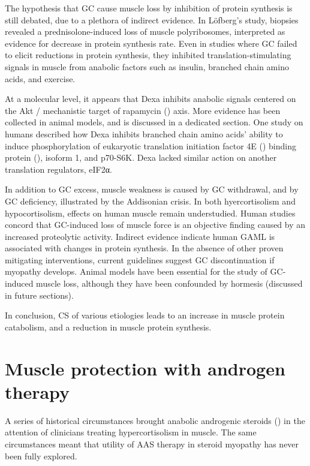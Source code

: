 \documentclass[12pt,english]{report}\usepackage[]{graphicx}\usepackage[]{color}
\begin{document}
The hypothesis that GC cause muscle loss by inhibition of protein
synthesis is still debated, due to a plethora of indirect evidence.
In Löfberg's study, biopsies revealed a prednisolone-induced loss
of muscle polyribosomes, interpreted as evidence for decrease in protein
synthesis rate. Even in studies where GC failed to elicit reductions
in protein synthesis, they inhibited translation-stimulating signals
in muscle from anabolic factors such as insulin\citep{louard1994glucocorticoids},
branched chain amino acids\citep{liu2001branched}, and exercise\citep{garrel1988effects}.

At a molecular level, it appears that Dexa inhibits anabolic signals
centered on the Akt / mechanistic target of rapamycin ()
axis. More evidence has been collected in animal models, and is discussed
in a dedicated section. One study on humans described how Dexa inhibits
branched chain amino acids' ability to induce phosphorylation of eukaryotic
translation initiation factor 4E ()
binding protein (), isoform
1, and p70-S6K\citep{liu2004glucocorticoids}. Dexa lacked similar
action on another translation regulators, eIF2α.

In addition to GC excess, muscle weakness is caused by GC withdrawal\citep{amatruda1960study},
and by GC deficiency, illustrated by the Addisonian crisis\citep{mor1987myopathy}.
In both hyercortisolism and hypocortisolism, effects on human muscle
remain understudied. Human studies concord that GC-induced loss of
muscle force is an objective finding caused by an increased proteolytic
activity. Indirect evidence indicate human GAML is associated with
changes in protein synthesis. In the absence of other proven mitigating
interventions, current guidelines suggest GC discontinuation if myopathy
develops. Animal models have been essential for the study of GC-induced
muscle loss, although they have been confounded by hormesis (discussed
in future sections).

In conclusion, CS of various etiologies leads to an increase in muscle
protein catabolism, and a reduction in muscle protein synthesis.


\section{Muscle protection with androgen therapy}

A series of historical circumstances brought anabolic androgenic steroids
() in the attention
of clinicians treating hypercortisolism in muscle. The same circumstances
meant that utility of AAS therapy in steroid myopathy has never been
fully explored.
\end{document}

